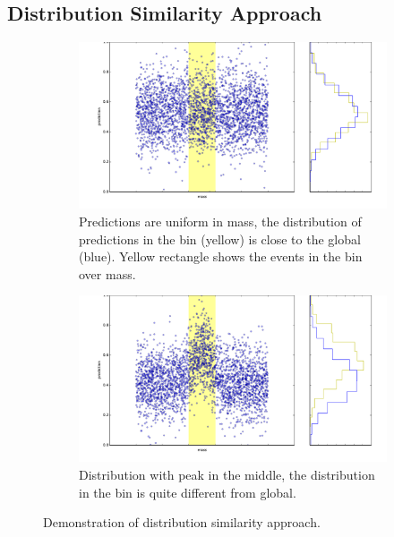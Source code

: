 \subsection{Distribution Similarity Approach}
\label{sec:similarity}

\begin{figure}[h]
		\centering
		\begin{subfigure}[b]{0.8\textwidth}
			\includegraphics[width=\textwidth]{graphs/bins_uniform_distribution.pdf}
			\caption{Predictions are uniform in mass, the distribution of predictions in the bin (yellow) is close to the global (blue).
			Yellow rectangle shows the events in the bin over mass.}
		\end{subfigure}
		\begin{subfigure}[b]{0.8\textwidth}
			\includegraphics[width=\textwidth]{graphs/bins_nonuniform_distribution.pdf}
			\caption{Distribution with peak in the middle, the distribution in the bin is quite different from global.}
		\end{subfigure}
		\caption{Demonstration of distribution similarity approach. \label{fig:dsavisualization}}
\end{figure}
